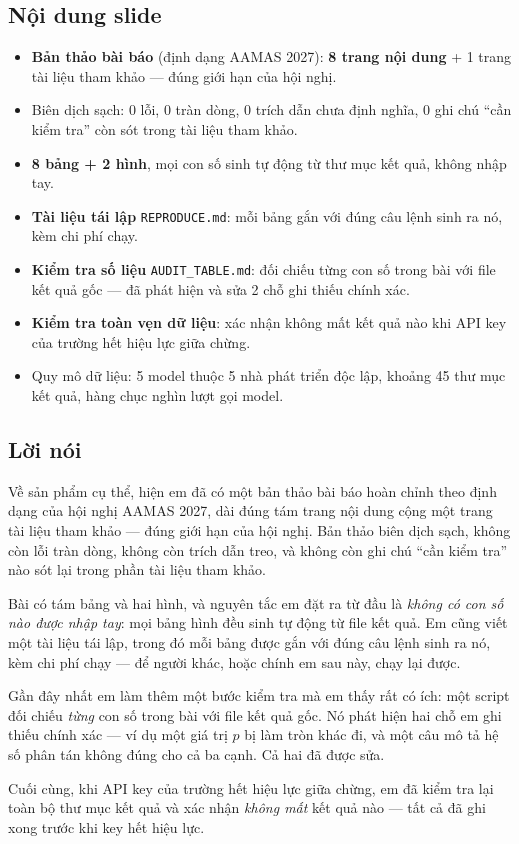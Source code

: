 \documentclass[11pt,a4paper]{article}
\newcommand{\noidung}{\subsection*{Nội dung slide}}
\newcommand{\loinoi}{\subsection*{Lời nói}}
\begin{document}
\noidung
\begin{itemize}
  \item \textbf{Bản thảo bài báo} (định dạng AAMAS 2027): \textbf{8 trang nội dung} +
        1 trang tài liệu tham khảo --- đúng giới hạn của hội nghị.
  \item Biên dịch sạch: 0 lỗi, 0 tràn dòng, 0 trích dẫn chưa định nghĩa,
        0 ghi chú ``cần kiểm tra'' còn sót trong tài liệu tham khảo.
  \item \textbf{8 bảng + 2 hình}, mọi con số sinh tự động từ thư mục kết quả, không
        nhập tay.
  \item \textbf{Tài liệu tái lập} \texttt{REPRODUCE.md}: mỗi bảng gắn với đúng câu lệnh
        sinh ra nó, kèm chi phí chạy.
  \item \textbf{Kiểm tra số liệu} \texttt{AUDIT\_TABLE.md}: đối chiếu từng con số trong
        bài với file kết quả gốc --- đã phát hiện và sửa 2 chỗ ghi thiếu chính xác.
  \item \textbf{Kiểm tra toàn vẹn dữ liệu}: xác nhận không mất kết quả nào khi API key
        của trường hết hiệu lực giữa chừng.
  \item Quy mô dữ liệu: 5 model thuộc 5 nhà phát triển độc lập, khoảng 45 thư mục kết quả, hàng chục nghìn
        lượt gọi model.
\end{itemize}

\loinoi
Về sản phẩm cụ thể, hiện em đã có một bản thảo bài báo hoàn chỉnh theo định dạng của
hội nghị AAMAS 2027, dài đúng tám trang nội dung cộng một trang tài liệu tham khảo ---
đúng giới hạn của hội nghị. Bản thảo biên dịch sạch, không còn lỗi tràn dòng, không còn
trích dẫn treo, và không còn ghi chú ``cần kiểm tra'' nào sót lại trong phần tài liệu
tham khảo.

Bài có tám bảng và hai hình, và nguyên tắc em đặt ra từ đầu là \emph{không có con số nào
được nhập tay}: mọi bảng hình đều sinh tự động từ file kết quả. Em cũng viết một tài
liệu tái lập, trong đó mỗi bảng được gắn với đúng câu lệnh sinh ra nó, kèm chi phí chạy
--- để người khác, hoặc chính em sau này, chạy lại được.

Gần đây nhất em làm thêm một bước kiểm tra mà em thấy rất có ích: một script đối chiếu
\emph{từng} con số trong bài với file kết quả gốc. Nó phát hiện hai chỗ em ghi thiếu
chính xác --- ví dụ một giá trị $p$ bị làm tròn khác đi, và một câu mô tả hệ số phân tán
không đúng cho cả ba cạnh. Cả hai đã được sửa.

Cuối cùng, khi API key của trường hết hiệu lực giữa chừng, em đã kiểm tra lại toàn bộ
thư mục kết quả và xác nhận \emph{không mất} kết quả nào --- tất cả đã ghi xong trước
khi key hết hiệu lực.
\end{document}
